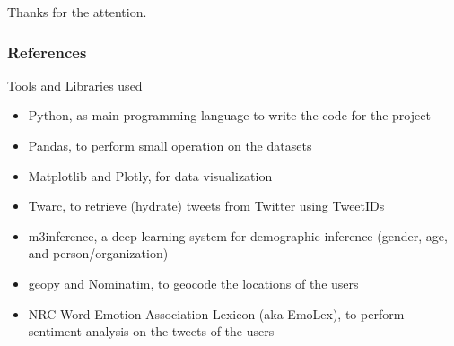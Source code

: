 \documentclass[8pt]{beamer}  %
\begin{document}
\begin{frame}

    \begin{center}
        \Large{Thanks for the attention.}
    \end{center}

\end{frame}

\begin{frame}
        \frametitle{References}
        \printbibliography
\end{frame}

\begin{frame}{Tools and Libraries used}

    \begin{itemize}
        \item Python, as main programming language to write the code for the project
        \item Pandas, to perform small operation on the datasets
        \item Matplotlib and Plotly, for data visualization
        \item Twarc, to retrieve (hydrate) tweets from Twitter using TweetIDs
        \item m3inference, a deep learning system for demographic inference (gender, age, and person/organization)
        \item geopy and Nominatim, to geocode the locations of the users
        \item NRC Word-Emotion Association Lexicon (aka EmoLex), to perform sentiment analysis on the tweets of the users
    \end{itemize}
    
\end{frame}
\end{document}
